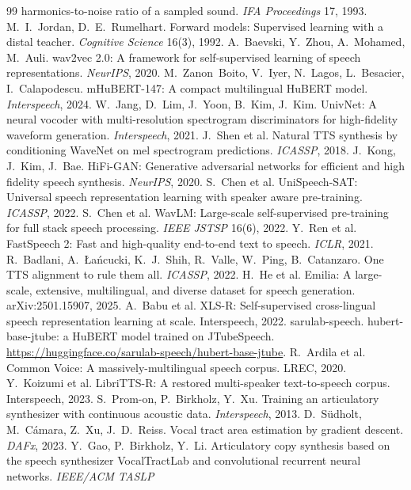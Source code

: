 \documentclass[10pt,a4paper,twocolumn]{article}
\begin{document}
\begin{thebibliography}{99}
harmonics-to-noise ratio of a sampled sound. \emph{IFA Proceedings} 17, 1993.
 M.~I.~Jordan, D.~E.~Rumelhart. Forward models: Supervised learning with a distal
teacher. \emph{Cognitive Science} 16(3), 1992.
 A.~Baevski, Y.~Zhou, A.~Mohamed, M.~Auli. wav2vec 2.0: A framework for
self-supervised learning of speech representations. \emph{NeurIPS}, 2020.
 M.~Zanon~Boito, V.~Iyer, N.~Lagos, L.~Besacier, I.~Calapodescu. mHuBERT-147: A
compact multilingual HuBERT model. \emph{Interspeech}, 2024.
 W.~Jang, D.~Lim, J.~Yoon, B.~Kim, J.~Kim. UnivNet: A neural vocoder with
multi-resolution spectrogram discriminators for high-fidelity waveform generation.
\emph{Interspeech}, 2021.
 J.~Shen et al. Natural TTS synthesis by conditioning WaveNet on mel
spectrogram predictions. \emph{ICASSP}, 2018.
 J.~Kong, J.~Kim, J.~Bae. HiFi-GAN: Generative adversarial networks for
efficient and high fidelity speech synthesis. \emph{NeurIPS}, 2020.
 S.~Chen et al. UniSpeech-SAT: Universal speech representation learning
with speaker aware pre-training. \emph{ICASSP}, 2022.
 S.~Chen et al. WavLM: Large-scale self-supervised pre-training for full stack
speech processing. \emph{IEEE JSTSP} 16(6), 2022.
 Y.~Ren et al. FastSpeech 2: Fast and high-quality end-to-end text to speech.
\emph{ICLR}, 2021.
 R.~Badlani, A.~Łańcucki, K.~J.~Shih, R.~Valle, W.~Ping, B.~Catanzaro. One TTS
alignment to rule them all. \emph{ICASSP}, 2022.
 H.~He et al. Emilia: A large-scale, extensive, multilingual, and diverse dataset
for speech generation. arXiv:2501.15907, 2025.
 A.~Babu et al. XLS-R: Self-supervised cross-lingual speech representation learning
at scale. Interspeech, 2022.
 sarulab-speech. hubert-base-jtube: a HuBERT model trained on JTubeSpeech.
\url{https://huggingface.co/sarulab-speech/hubert-base-jtube}.
 R.~Ardila et al. Common Voice: A massively-multilingual speech corpus. LREC, 2020.
 Y.~Koizumi et al. LibriTTS-R: A restored multi-speaker text-to-speech corpus. Interspeech, 2023.
 S.~Prom-on, P.~Birkholz, Y.~Xu. Training an articulatory synthesizer with
continuous acoustic data. \emph{Interspeech}, 2013.
 D.~Südholt, M.~Cámara, Z.~Xu, J.~D.~Reiss. Vocal tract area estimation by
gradient descent. \emph{DAFx}, 2023.
 Y.~Gao, P.~Birkholz, Y.~Li. Articulatory copy synthesis based on the speech
synthesizer VocalTractLab and convolutional recurrent neural networks. \emph{IEEE/ACM TASLP}

\end{thebibliography}
\end{document}
